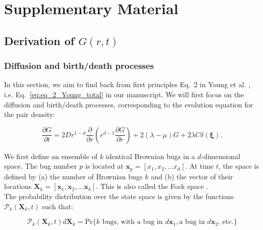 \section*{Supplementary Material}

\subsection*{Derivation of $G(r,t)$}

\subsubsection*{Diffusion and birth/death processes}

In this section, we aim to find back from first principles Eq.~2 in Young et al. \cite{young_reproductive_2001}, i.e. Eq.~\ref{eq:eq_2_Young_total} in our manuscript. We will first focus on the diffusion and birth/death processes, corresponding to the evolution equation for the pair density:

\begin{equation}
 \frac{\partial G}{\partial t}=2Dr^{1-d}\frac{\partial}{\partial r}\left(r^{d-1}\frac{\partial G}{\partial r}\right)+2(\lambda-\mu)G+2\lambda C\delta(\boldsymbol{\xi}).\label{eq:eq_2_Young_diffusionbirth}
\end{equation}

\vspace{1.25em}

We first define an ensemble of $k$ identical Brownian bugs in a $d$-dimensional space. The bug number $p$ is located at $\boldsymbol{x}_{p}=[x_1,x_2,...x_{d}]$. At time $t$, the space is defined by (a) the number of Brownian
bugs $k$ and (b) the vector of their locations $\boldsymbol{X}_{k}=[\boldsymbol{x}_{1},\boldsymbol{x}_{2},...\boldsymbol{x}_{k}]$. This is also called the Fock space \citep{birch_master_2006}.\\

The probability distribution over the state space is given by the functions $\mathcal{P}_{k}(\boldsymbol{X}_{k},t)$ such that:

\begin{equation}
\mathcal{P}_{k}(\boldsymbol{X}_{k},t)d\boldsymbol{X}_{k}=\text{Pr}\{k\text{ bugs, with a bug in }d\boldsymbol{x}_{1},\text{a bug in }d\boldsymbol{x}_{2}\text{, etc.}\}
\end{equation}

\vspace{1.25em}

